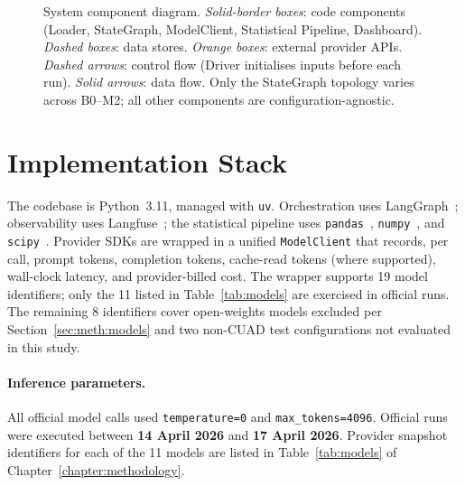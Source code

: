 \begin{figure}[h]
  \caption{System component diagram.
  \emph{Solid-border boxes}: code components (Loader, StateGraph, ModelClient,
  Statistical Pipeline, Dashboard).
  \emph{Dashed boxes}: data stores.
  \emph{Orange boxes}: external provider APIs.
  \emph{Dashed arrows}: control flow (Driver initialises inputs before each run).
  \emph{Solid arrows}: data flow.
  Only the StateGraph topology varies across B0--M2; all other components are
  configuration-agnostic.}
  \label{fig:sys-components}
\end{figure}

\section{Implementation Stack}\label{sec:sys:stack}

The codebase is Python~3.11, managed with \texttt{uv}. Orchestration uses
LangGraph~\cite{langgraph2024}; observability uses Langfuse~\cite{langfuse2024};
the statistical pipeline uses \texttt{pandas}~\cite{pandas2020},
\texttt{numpy}~\cite{harris2020array}, and \texttt{scipy}~\cite{virtanen2020scipy}.
Provider SDKs are wrapped in a unified \texttt{ModelClient} that records, per call,
prompt tokens, completion tokens, cache-read tokens (where supported), wall-clock
latency, and provider-billed cost. The wrapper supports 19 model identifiers; only the 11 listed in
Table~\ref{tab:models} are exercised in official runs. The remaining 8 identifiers
cover open-weights models excluded per Section~\ref{sec:meth:models} and two
non-CUAD test configurations not evaluated in this study.

\paragraph{Inference parameters.}
All official model calls used \texttt{temperature=0} and \texttt{max\_tokens=4096}.
Official runs were executed between \textbf{14 April 2026} and
\textbf{17 April 2026}. Provider snapshot identifiers for each of the 11
models are listed in Table~\ref{tab:models} of
Chapter~\ref{chapter:methodology}.

